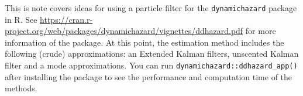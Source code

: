 \renewcommand{\vec}[1]{\bm{#1}}
\newcommand{\vect}[1]{\widetilde{\vec{#1}}}
\newcommand{\vecb}[1]{\bar{\vec{#1}}}
\newcommand{\vecLarrow}[1]{\overleftarrow{\vec{#1}}}
\newcommand{\vecLRarrow}[1]{\overleftrightarrow{\vec{#1}}}


\newcommand{\mat}[1]{\mathbf{#1}}
\newcommand{\matt}[1]{\widetilde{\mat{#1}}}
\newcommand{\matLarrow}[1]{\overleftarrow{\mat{#1}}}
\newcommand{\matLRarrow}[1]{\overleftrightarrow{\mat{#1}}}

\newcommand{\Lbrace}[1]{\left\{ #1\right\}}
\newcommand{\Lparen}[1]{\left( #1\right)}
\newcommand{\Cond}[2]{\left. #1 \vphantom{#2} \right\vert  #2}

\newcommand{\Prob}{\text{P}}
\newcommand{\VAR}{\text{Var}}
\newcommand{\E}{\text{E}}
\newcommand{\COV}{\text{E}}

\newcommand{\optor}[2]{#1\Lparen{#2}}
\newcommand{\optorC}[3]{\optor{#1}{\Cond{#2}{#3}}}

\newcommand{\prop}[1]{\optor{\Prob}{#1}}
\newcommand{\propC}[2]{\optorC{\Prob}{#1}{#2}}

\newcommand{\expec}[1]{\optor{\E}{#1}}
\newcommand{\expecC}[2]{\optorC{\E}{#1}{#2}}

\newcommand{\varp}[1]{\optor{\VAR}{#1}}
\newcommand{\varpC}[2]{\optorC{\VAR}{#1}{#2}}

\newcommand{\covp}[1]{\optor{\COV}{#1}}
\newcommand{\covpC}[2]{\optorC{\COV}{#1}{#2}}

\newcommand{\propAproxC}[2]{\optorC{\widetilde{p}}{#1}{#2}}

\newcommand{\normal}[2]{\optor{\mathcal{N}}{#1,#2}}
\newcommand{\normalC}[3]{\optorC{\mathcal{N}}{#1}{#2,#3}}

\newcommand{\IDC}[2]{\optorC{q}{#1}{#2}}
\newcommand{\IDAproxC}[2]{\optorC{\widetilde{q}}{#1}{#2}}

\newcommand{\diag}[1]{\optor{\text{diag}}{#1}}

\newcommand{\KF}[3]{#1_{\left. #2 \right\vert #3}}
\newcommand{\KFSup}[4]{#1_{\left. #2 \right\vert #3}^{(#4)}}

\newcommand{\partic}[3]{#1_{#2}^{\Lparen{#3}}}
\newcommand{\particB}[3]{\widetilde{#1}_{#2}^{\Lparen{#3}}}
\newcommand{\particS}[3]{\widehat{#1}_{#2}^{\Lparen{#3}}}

\newcommand{\bigO}[1]{\mathcal{O}\Lparen{#1}}


This is note covers ideas for using a particle filter for the \verb|dynamichazard| package in R. See \url{https://cran.r-project.org/web/packages/dynamichazard/vignettes/ddhazard.pdf} for more information of the package. At this point, the estimation method includes the following (crude) approximations: an Extended Kalman filters, unscented Kalman filter and a mode approximations. You can run \verb|dynamichazard::ddhazard_app()| after installing the package to see the performance and computation time of the methods.

